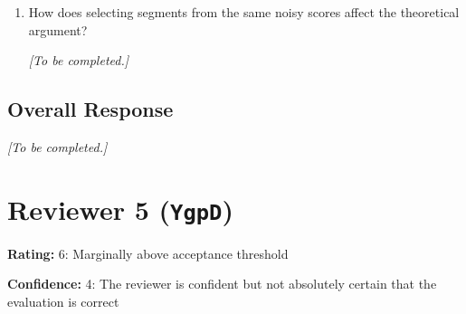 \documentclass[11pt,a4paper]{article}
\begin{document}
\begin{enumerate}
\item How does selecting segments from the same noisy scores affect the theoretical argument?
\par{}
\begin{responsebox}[frametitle={Response to Q5},nobreak=true]
\textit{[To be completed.]}\par\vspace{1em}
\end{responsebox}

\end{enumerate}

\subsection*{Overall Response}
\par{}
\begin{responsebox}[frametitle={Overall Response to Reviewer 4 (hTMj)},nobreak=true]
\textit{[To be completed.]}\par\vspace{1em}
\end{responsebox}



\clearpage

\section{Reviewer 5 (\texttt{YgpD})}
\label{reviewer:5}
\noindent\textbf{Rating:} 6: Marginally above acceptance threshold\par
\noindent\textbf{Confidence:} 4: The reviewer is confident but not absolutely certain that the evaluation is correct
\end{document}
